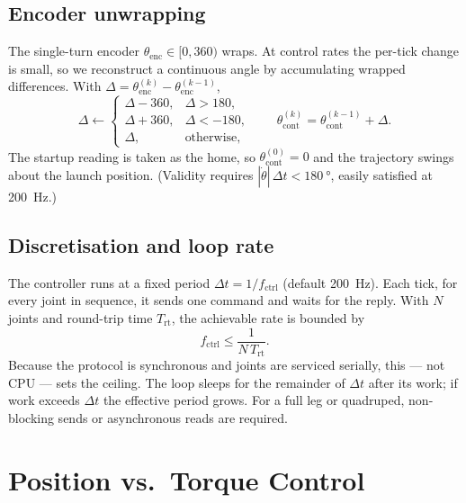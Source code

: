 \documentclass[11pt,a4paper]{article}
\begin{document}
\subsection{Encoder unwrapping}
\label{sec:unwrap}
The single-turn encoder $\theta_{\text{enc}}\in[0,360)$ wraps. At control rates
the per-tick change is small, so we reconstruct a continuous angle by
accumulating wrapped differences. With $\Delta = \theta_{\text{enc}}^{(k)} -
\theta_{\text{enc}}^{(k-1)}$,
\begin{equation}
  \Delta \leftarrow
  \begin{cases}
    \Delta - 360, & \Delta > 180,\\
    \Delta + 360, & \Delta < -180,\\
    \Delta, & \text{otherwise},
  \end{cases}
  \qquad
  \theta_{\text{cont}}^{(k)} = \theta_{\text{cont}}^{(k-1)} + \Delta .
\end{equation}
The startup reading is taken as the home, so $\theta_{\text{cont}}^{(0)}=0$ and
the trajectory swings about the launch position. (Validity requires
$|\dot\theta|\,\Delta t < \SI{180}{\degree}$, easily satisfied at \SI{200}{\hertz}.)

\subsection{Discretisation and loop rate}
\label{sec:rate}
The controller runs at a fixed period $\Delta t = 1/f_{\text{ctrl}}$ (default
\SI{200}{\hertz}). Each tick, for every joint in sequence, it sends one command and
waits for the reply. With $N$ joints and round-trip time $T_{\text{rt}}$, the
achievable rate is bounded by
\begin{equation}
  f_{\text{ctrl}} \le \frac{1}{N\,T_{\text{rt}}} .
\end{equation}
Because the protocol is synchronous and joints are serviced serially, this --- not
CPU --- sets the ceiling. The loop sleeps for the remainder of $\Delta t$ after
its work; if work exceeds $\Delta t$ the effective period grows. For a full leg
or quadruped, non-blocking sends or asynchronous reads are required.

\section{Position vs.\ Torque Control}
\end{document}
